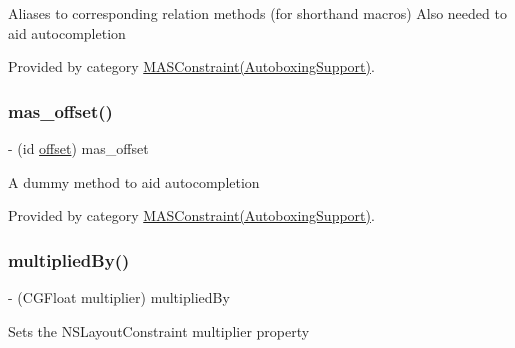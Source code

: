 Aliases to corresponding relation methods (for shorthand macros) Also needed to aid autocompletion 

Provided by category \mbox{\hyperlink{category_m_a_s_constraint_07_autoboxing_support_08_a3a362a9fa62f0adae01eb60b6a8508d1}{M\+A\+S\+Constraint(\+Autoboxing\+Support)}}.

\mbox{\label{interface_m_a_s_constraint_aa1b8cf5bbeff5df1ab0d89fb95d31fe9}} 
\subsubsection{\texorpdfstring{mas\+\_\+offset()}{mas\_offset()}}
{\footnotesize\ttfamily -\/ (id \mbox{\hyperlink{interface_m_a_s_constraint_a9fc79ce794fd6b4bf204fcd8e6d07345}{offset}}) mas\+\_\+offset \begin{DoxyParamCaption}{ }\end{DoxyParamCaption}}

A dummy method to aid autocompletion 

Provided by category \mbox{\hyperlink{category_m_a_s_constraint_07_autoboxing_support_08_aa1b8cf5bbeff5df1ab0d89fb95d31fe9}{M\+A\+S\+Constraint(\+Autoboxing\+Support)}}.

\mbox{\label{interface_m_a_s_constraint_a4893123b37d88a88685341b9b8b01cb9}} 
\subsubsection{\texorpdfstring{multiplied\+By()}{multipliedBy()}}
{\footnotesize\ttfamily -\/ (C\+G\+Float multiplier) multiplied\+By \begin{DoxyParamCaption}{ }\end{DoxyParamCaption}}

Sets the N\+S\+Layout\+Constraint multiplier property \mbox{\label{interface_m_a_s_constraint_a9fc79ce794fd6b4bf204fcd8e6d07345}} 
